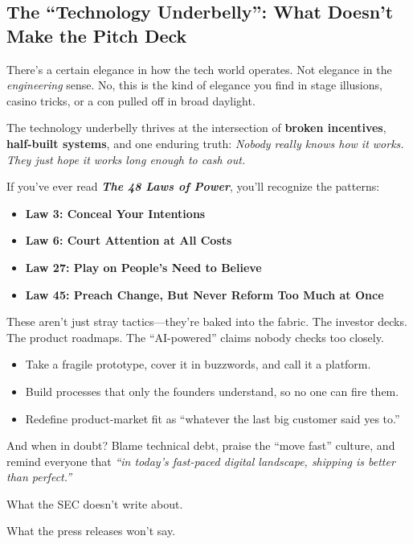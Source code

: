   \subsection{The ``Technology Underbelly'': What Doesn’t Make the Pitch Deck}

  There’s a certain elegance in how the tech world operates.  
  Not elegance in the \textit{engineering} sense.
  No, this is the kind of elegance you find in stage illusions, casino tricks, or a con pulled off in broad daylight.
  
  The technology underbelly thrives at the intersection of \textbf{broken incentives}, \textbf{half-built systems}, and one enduring truth:  
  \textit{Nobody really knows how it works. They just hope it works long enough to cash out.}
  
  If you’ve ever read \textbf{\textit{The 48 Laws of Power}}, you’ll recognize the patterns:
  
  \begin{itemize}
    \item \textbf{Law 3: Conceal Your Intentions}
    \item \textbf{Law 6: Court Attention at All Costs}
    \item \textbf{Law 27: Play on People’s Need to Believe}
    \item \textbf{Law 45: Preach Change, But Never Reform Too Much at Once}
  \end{itemize}
  
  These aren’t just stray tactics—they’re baked into the fabric.  
  The investor decks. The product roadmaps. The “AI-powered” claims nobody checks too closely.
  
  \begin{itemize}
    \item Take a fragile prototype, cover it in buzzwords, and call it a platform.
    \item Build processes that only the founders understand, so no one can fire them.
    \item Redefine product-market fit as “whatever the last big customer said yes to.”
  \end{itemize}
  
  And when in doubt? Blame technical debt, praise the “move fast” culture, and remind everyone that  
  \textit{“in today’s fast-paced digital landscape, shipping is better than perfect.”}
  
  What the SEC doesn’t write about.  

  What the press releases won’t say.  

